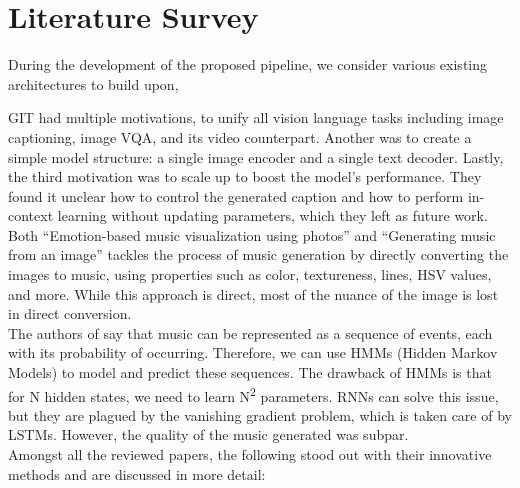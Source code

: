 \documentclass[conference]{IEEEtran}
\begin{document}
\section{Literature Survey}

{
During the development of the proposed pipeline, we consider various existing architectures to build upon, 

GIT \citep{wang2022git} had multiple motivations, to unify all vision language tasks including image captioning, image VQA, and its video counterpart. Another was to create a simple model structure: a single image encoder and a single text decoder. Lastly, the third motivation was to scale up to boost the model's performance. They found it unclear how to control the generated caption and how to perform in-context learning without updating parameters, which they left as future work.
\\

Both ``Emotion-based music visualization using photos'' \citep{chen2008emotion} and ``Generating music from an image''
\citep{sergio2015generating} tackles the process of music generation by directly converting the images to music, using properties such as color, textureness, lines, HSV values, and more. While this approach is direct, most of the nuance of the image is lost in direct conversion.
\\

The authors of \citep{choi2016text} say that music can be represented as a sequence of events, each with its probability of occurring. Therefore, we can use HMMs (Hidden Markov Models) to model and predict these sequences.
The drawback of HMMs is that for N hidden states, we need to learn N\textsuperscript{2} parameters. RNNs can solve this issue, but they are plagued by the vanishing gradient problem, which is taken care of by LSTMs. However, the quality of the music generated was subpar.
\\

Amongst all the reviewed papers, the following stood out with their innovative methods and are discussed in more detail:
}
\end{document}
